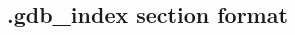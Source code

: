 \documentclass[class=book, crop=false]{standalone}
\begin{document}
\begin{CJK}{UTF8}{gbsn}

\chapter{.gdb\_index section format}



\cleardoublepage

\end{CJK}
\end{document}
